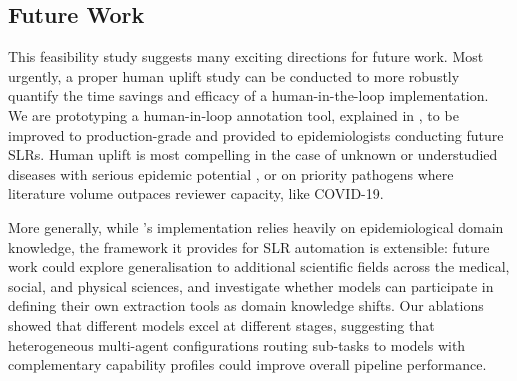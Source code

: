 

\subsection{Future Work}


This feasibility study suggests many exciting directions for future work. Most urgently, a proper human uplift study can be conducted to more robustly quantify the time savings and efficacy of a human-in-the-loop implementation. We are prototyping a human-in-loop annotation tool, explained in , to be improved to production-grade and provided to epidemiologists conducting future SLRs. Human uplift is most compelling in the case of unknown or understudied diseases with serious epidemic potential \citep{Mehand2018_WHO_RnD_Blueprint_review}, or on priority pathogens where literature volume outpaces reviewer capacity, like COVID-19.

More generally, while \name{}'s implementation relies heavily on epidemiological domain knowledge, the framework it provides for SLR automation is extensible: future work could explore generalisation to additional scientific fields across the medical, social, and physical sciences, and investigate whether models can participate in defining their own extraction tools as domain knowledge shifts. Our ablations showed that different models excel at different stages, suggesting that heterogeneous multi-agent configurations routing sub-tasks to models with complementary capability profiles could improve overall pipeline performance.


